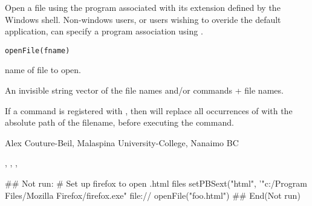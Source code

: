 \documentclass[letterpaper]{book}
\begin{document}
\begin{Description}\relax
Open a file using the program associated with its extension 
defined by the Windows shell.  Non-windows users, or users 
wishing to overide the default application, can specify a 
program association using .
\end{Description}
\begin{Usage}
\begin{verbatim}
openFile(fname)
\end{verbatim}
\end{Usage}
\begin{Arguments}
\begin{ldescription}
\item[\code{fname}] name of file to open.
\end{ldescription}
\end{Arguments}
\begin{Value}
An invisible string vector of the file names and/or commands + file names.
\end{Value}
\begin{Note}\relax
If a command is registered with , then 
 will replace all occurrences of  
with the absolute path of the filename, before executing the command.
\end{Note}
\begin{Author}\relax
Alex Couture-Beil, Malaspina University-College, Nanaimo BC
\end{Author}
\begin{SeeAlso}\relax
{}, , ,
\end{SeeAlso}
\begin{Examples}
\begin{ExampleCode}
## Not run: 
# Set up firefox to open .html files
setPBSext("html", '"c:/Program Files/Mozilla Firefox/firefox.exe" file://%
openFile("foo.html")
## End(Not run)
\end{ExampleCode}
\end{Examples}
\end{document}
